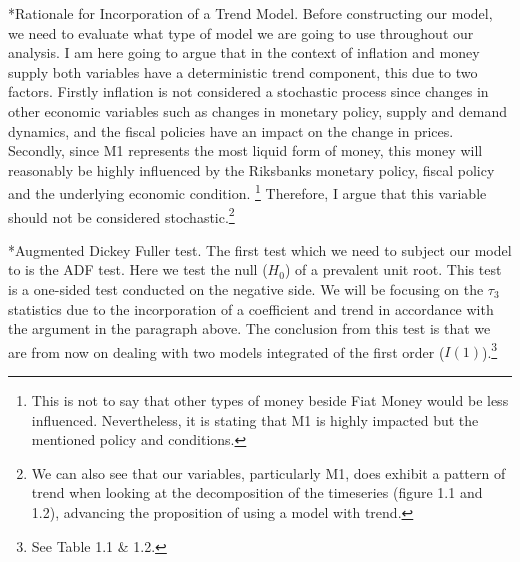 \documentclass{article}
\makeatletter
\renewcommand{\paragraph}{\@startsection{paragraph}{4}{\z@}{3.25ex \@plus 1ex \@minus .2ex}{-1em}{\color{mydarkblue}\normalfont\small\bfseries}}
\makeatother
\begin{document}
        \paragraph*{Rationale for Incorporation of a Trend Model.}
        Before constructing our model, we need to evaluate what type of model we are going 
        to use throughout our analysis. I am here going to argue that in the context of inflation and money 
        supply both variables have a deterministic trend component, this due to two factors. Firstly inflation
        is not considered a stochastic process since changes in other economic variables such as changes
        in monetary policy, supply and demand dynamics, and the fiscal policies have an impact on the change in 
        prices. Secondly, since M1 represents the most liquid form of money, this money will reasonably be 
        highly influenced by the Riksbanks monetary policy, fiscal policy and the underlying economic condition. 
        \footnote{This is not to say that other types of money beside Fiat Money would be less influenced. 
        Nevertheless, it is stating that M1 is highly impacted but the mentioned policy and conditions.}
        Therefore, I argue that this variable should not be considered stochastic.\footnote{We can also see
        that our variables, particularly M1, does exhibit a pattern of trend when looking at the decomposition
        of the timeseries (figure 1.1 and 1.2), advancing the proposition of using a model with trend.}

        \paragraph*{Augmented Dickey Fuller test.} The first test which we need to subject our model to 
        is the ADF test. Here we test the null ($H_0$) of a prevalent unit root. This test is a one-sided 
        test conducted on the negative side. We will be focusing on the $\tau_3$ statistics due to the
        incorporation of a coefficient and trend in accordance with the argument in the paragraph above.
        The conclusion from this test is that we are from now on dealing with two models integrated of the 
        first order ($I(1)$).\footnote{See Table 1.1 \& 1.2.}
        
\end{document}
